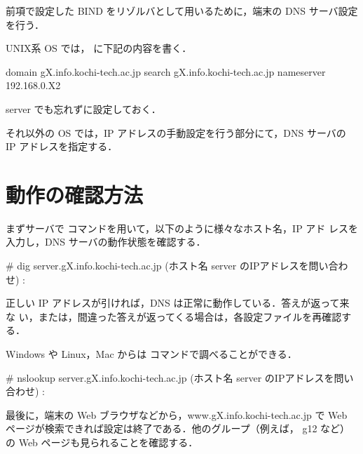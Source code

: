 前項で設定した BIND をリゾルバとして用いるために，端末の DNS サーバ設定
を行う．

UNIX系 OS では， に下記の内容を書く．

\begin{cli}
domain          gX.info.kochi-tech.ac.jp
search          gX.info.kochi-tech.ac.jp
nameserver      192.168.0.X2
\end{cli}

server でも忘れずに設定しておく．

それ以外の OS では，IP アドレスの手動設定を行う部分にて，DNS サーバの IP
アドレスを指定する．

\section{動作の確認方法}

まずサーバで  コマンドを用いて，以下のように様々なホスト名，IP アド
レスを入力し，DNS サーバの動作状態を確認する．
\begin{cli}
# dig server.gX.info.kochi-tech.ac.jp
 (ホスト名 server のIPアドレスを問い合わせ)
 :
\end{cli}
正しい IP アドレスが引ければ，DNS は正常に動作している．答えが返って来な
い，または，間違った答えが返ってくる場合は，各設定ファイルを再確認する．

Windows や Linux，Mac からは  コマンドで調べることができる．
\begin{cli}
# nslookup server.gX.info.kochi-tech.ac.jp
 (ホスト名 server のIPアドレスを問い合わせ)
 :
\end{cli}

最後に，端末の Web ブラウザなどから，www.gX.info.kochi-tech.ac.jp で Web
ページが検索できれば設定は終了である．他のグループ（例えば， g12 など）
の Web ページも見られることを確認する．



\clearpage